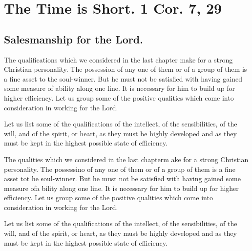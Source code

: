 \documentclass[
]{book}
\begin{document}
\hypertarget{the-time-is-short.-1-cor.-7-29}{%
\chapter{The Time is Short. 1 Cor. 7, 29}\label{the-time-is-short.-1-cor.-7-29}}

\hypertarget{salesmanship-for-the-lord.}{%
\section*{Salesmanship for the Lord.}\label{salesmanship-for-the-lord.}}

The qualifications which we considered in the last chapter make for a strong Christian personality. The possession of any one of them or of a group of them is a fine asset to the soul-winner. But he must not be satisfied with having gained some measure of ability along one line. It is necessary for him to build up for higher efficiency. Let us group some of the positive qualities which come into consideration in working for the Lord.

Let us list some of the qualifications of the intellect, of the sensibilities, of the will, and of the spirit, or heart, as they must be highly developed and as they must be kept in the highest possible state of efficiency.

The qualities which we considered in the last chapterm ake for a strong Christian personality. The possessino of any one of them or of a group of them is a fine asset tot he soul-winner. But he must not be satisfied with having gained some measure ofa bility along one line. It is necessary for him to build up for higher efficiency. Let us group some of the positive qualities which come into consideration in working for the Lord.

Let us list some of the qualifications of the intellect, of the sensibilities, of the will, and of the spirit, or heart, as they must be highly developed and as they must be kept in the highest possible state of efficiency.
\end{document}
